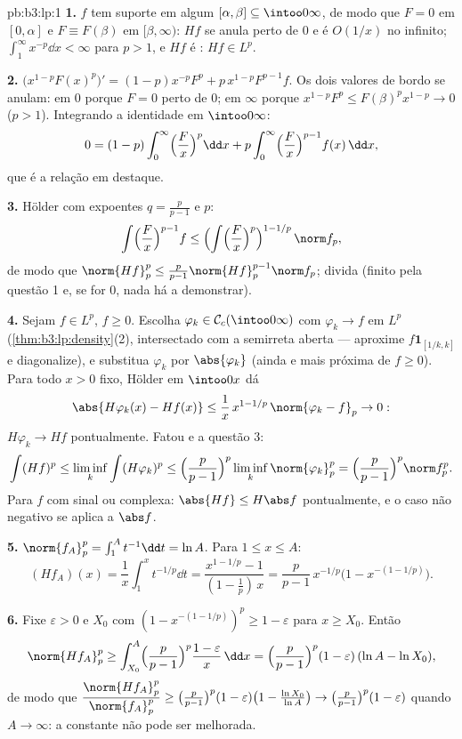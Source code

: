 \begin{solution}{pb:b3:lp:1}
\textbf{1.} $f$ tem suporte em algum $[\alpha, \beta]
\subseteq \intoo0\infty$, de modo que $F = 0$ em $[0, \alpha]$ e $F
\equiv F(\beta)$ em $[\beta, \infty)$: $Hf$ se anula perto de $0$
e é $O(1/x)$ no infinito; $\int_1^\infty x^{-p}\dd x <
\infty$ para $p > 1$, e $Hf$ é : $Hf \in L^p$.

\textbf{2.} $\bigl(x^{1-p}F(x)^p\bigr)' = (1-p)x^{-p}F^p +
p\,x^{1-p}F^{p-1}f$. Os dois valores de bordo se anulam: em $0$
porque $F = 0$ perto de $0$; em $\infty$ porque $x^{1-p}F^p \leq
F(\beta)^p x^{1-p} \to 0$ ($p > 1$). Integrando a identidade
em $\intoo0\infty$:
\[
0 = (1 - p)\int_0^\infty\Bigl(\frac Fx\Bigr)^p\dd x
+ p\int_0^\infty\Bigl(\frac Fx\Bigr)^{p-1}f(x)\,\dd x,
\]
que é a relação em destaque.

\textbf{3.} Hölder com expoentes $q = \frac p{p-1}$ e $p$:
\[
\int\Bigl(\frac Fx\Bigr)^{p-1}f
\leq \Bigl(\int\Bigl(\frac
Fx\Bigr)^{p}\Bigr)^{1 - 1/p}\,\norm f_p ,
\]
de modo que $\norm{Hf}_p^p \leq \frac p{p-1}\norm{Hf}_p^{p-1}\norm
f_p$; divida (finito pela questão 1 e, se for $0$, nada há
a demonstrar).

\textbf{4.} Sejam $f \in L^p$, $f \geq 0$. Escolha $\varphi_k \in
\mathcal C_c(\intoo0\infty)$ com $\varphi_k \to f$ em $L^p$
(\cref{thm:b3:lp:density}(2), intersectado com a semirreta
aberta --- aproxime $f\mathbf 1_{[1/k, k]}$ e
diagonalize), e substitua $\varphi_k$ por $\abs{\varphi_k}$
(ainda  e mais próxima de $f \geq 0$). Para todo
$x > 0$ fixo, Hölder em $\intoo0x$ dá
\[
\abs{H\varphi_k(x) - Hf(x)} \leq
\frac1x\,x^{1 - 1/p}\,\norm{\varphi_k - f}_p \to 0 :
\]
$H\varphi_k \to Hf$ pontualmente. Fatou e a questão 3:
\[
\int (Hf)^p \leq \liminf_k\int(H\varphi_k)^p
\leq \Bigl(\frac p{p-1}\Bigr)^p\liminf_k\norm{\varphi_k}_p^p
= \Bigl(\frac p{p-1}\Bigr)^p\norm f_p^p .
\]
Para $f$ com sinal ou complexa: $\abs{Hf} \leq H\abs f$ pontualmente,
e o caso não negativo se aplica a $\abs f$.

\textbf{5.} $\norm{f_A}_p^p = \int_1^A t^{-1}\dd t = \ln A$.
Para $1 \leq x \leq A$:
\[
(Hf_A)(x) = \frac1x\int_1^x t^{-1/p}\dd t
= \frac{x^{1 - 1/p} - 1}{(1 - \tfrac1p)\,x}
= \frac p{p-1}\,x^{-1/p}\bigl(1 - x^{-(1 - 1/p)}\bigr).
\]

\textbf{6.} Fixe $\varepsilon > 0$ e $X_0$ com $(1 -
x^{-(1-1/p)})^p \geq 1 - \varepsilon$ para $x \geq X_0$. Então
\[
\norm{Hf_A}_p^p \geq \int_{X_0}^A\Bigl(\frac
p{p-1}\Bigr)^p\frac{1 - \varepsilon}{x}\,\dd x
= \Bigl(\frac p{p-1}\Bigr)^p(1 - \varepsilon)\,(\ln A - \ln
X_0),
\]
de modo que $\dfrac{\norm{Hf_A}_p^p}{\norm{f_A}_p^p} \geq \bigl(\frac
p{p-1}\bigr)^p(1 - \varepsilon)\bigl(1 - \frac{\ln X_0}{\ln
A}\bigr) \to \bigl(\frac p{p-1}\bigr)^p(1 - \varepsilon)$ quando
$A \to \infty$: a constante não pode ser melhorada.


\end{solution}
